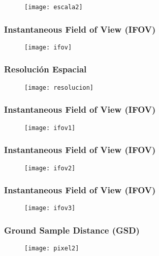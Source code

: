 \documentclass[14pt]{beamer}
\begin{document}
\begin{frame}
 \begin{figure}
    \centering
    \texttt{[image: escala2]}
  \end{figure}
\end{frame}
\begin{frame}
\frametitle{Instantaneous Field of View (IFOV)}
 \begin{figure}
    \centering
    \texttt{[image: ifov]}
  \end{figure}
\end{frame}
\begin{frame}
\frametitle{Resolución Espacial}
 \begin{figure}
    \centering
    \texttt{[image: resolucion]}
  \end{figure}
\end{frame}
\begin{frame}
\frametitle{Instantaneous Field of View (IFOV)}
 \begin{figure}
    \centering
    \texttt{[image: ifov1]}
  \end{figure}
\end{frame}
\begin{frame}
\frametitle{Instantaneous Field of View (IFOV)}
 \begin{figure}
    \centering
    \texttt{[image: ifov2]}
  \end{figure}
\end{frame}
\begin{frame}
\frametitle{Instantaneous Field of View (IFOV)}
 \begin{figure}
    \centering
    \texttt{[image: ifov3]}
  \end{figure}
\end{frame}
\begin{frame}
\frametitle{Ground Sample Distance (GSD)}
 \begin{figure}
    \centering
    \texttt{[image: pixel2]}
  \end{figure}
\end{frame}
\end{document}
